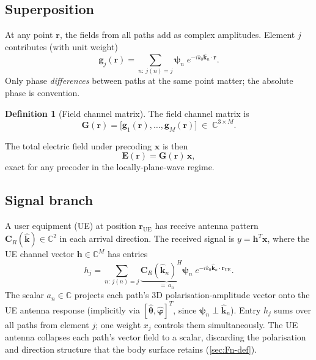 \documentclass[11pt,a4paper]{article}
\theoremstyle{definition}      %
\newtheorem{definition}[definition]{Definition}
\begin{document}
\subsection{Superposition}\label{sec:G-def}

At any point $\mathbf{r}$, the fields from all paths add as
complex amplitudes.  Element $j$ contributes (with unit weight)
\begin{equation}
  \mathbf{g}_j(\mathbf{r})
  = \sum_{n:\,j(n)=j} \boldsymbol{\psi}_n\;
    e^{-ik_0\hat{\mathbf{k}}_n \cdot \mathbf{r}}.
\end{equation}
Only phase \emph{differences} between paths at the same point matter;
the absolute phase is convention.

\begin{definition}[Field channel matrix]\label{def:field-channel}
The field channel matrix is
\begin{equation}\label{eq:G-def}
  \mathbf{G}(\mathbf{r})
  = \bigl[\mathbf{g}_1(\mathbf{r}),\ldots,\mathbf{g}_M(\mathbf{r})\bigr]
  \;\in\; \mathbb{C}^{3\times M}.
\end{equation}
\end{definition}
The total electric field under precoding $\mathbf{x}$ is then
\begin{equation}\label{eq:E-Gx}
  \boxed{\mathbf{E}(\mathbf{r}) = \mathbf{G}(\mathbf{r})\,\mathbf{x},}
\end{equation}
exact for any precoder in the locally-plane-wave regime.

\subsection{Signal branch}\label{sec:ue-mrt}

A user equipment (UE) at position $\mathbf{r}_\mathrm{UE}$ has
receive antenna pattern $\mathbf{C}_R(\hat{\mathbf{k}}) \in
\mathbb{C}^2$ in each arrival direction.  The received signal is
$y = \mathbf{h}^T\mathbf{x}$, where the UE channel vector
$\mathbf{h} \in \mathbb{C}^M$ has entries
\begin{equation}\label{eq:h-def}
  h_j = \sum_{n:\,j(n)=j}
    \underbrace{\mathbf{C}_R(\hat{\mathbf{k}}_n)^H
    \boldsymbol{\psi}_n}_{=\,a_n}\;
    e^{-ik_0\hat{\mathbf{k}}_n\cdot\mathbf{r}_\mathrm{UE}}.
\end{equation}
The scalar $a_n \in \mathbb{C}$ projects each path's 3D
polarisation-amplitude vector onto the UE antenna response
(implicitly via
$[\hat{\boldsymbol{\theta}},\hat{\boldsymbol{\varphi}}]^T$, since
$\boldsymbol{\psi}_n \perp \hat{\mathbf{k}}_n$).  Entry $h_j$ sums
over all paths from element $j$; one weight $x_j$ controls them
simultaneously.  The UE antenna collapses each path's vector field
to a scalar, discarding the polarisation and direction structure
that the body surface retains (\cref{sec:Fn-def}).
\end{document}
